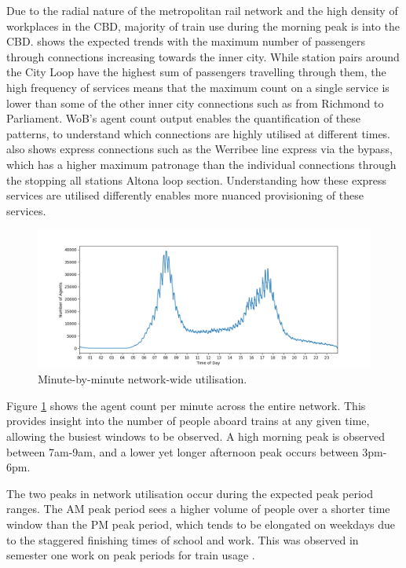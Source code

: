Due to the radial nature of the metropolitan rail network and the high density of workplaces in the CBD, majority of train use during the morning peak is into the CBD.  shows the expected trends with the maximum number of passengers through connections increasing towards the inner city. While station pairs around the City Loop have the highest sum of passengers travelling through them, the high frequency of services means that the maximum count on a single service is lower than some of the other inner city connections such as from Richmond to Parliament. WoB's agent count output enables the quantification of these patterns, to understand which connections are highly utilised at different times.  also shows express connections such as the Werribee line express via the bypass, which has a higher maximum patronage than the individual connections through the stopping all stations Altona loop section. Understanding how these express services are utilised differently enables more nuanced provisioning of these services. 

\begin{figure}[ht]
    \centering
    \includegraphics[width=\linewidth]{images/Case_Study/network_util.png}
    \caption[Network-wide utilisation]{Minute-by-minute network-wide utilisation. }
    \label{fig:network_utilisation}
\end{figure}

Figure \ref{fig:network_utilisation} shows the agent count per minute across the entire network. This provides insight into the number of people aboard trains at any given time, allowing the busiest windows to be observed. A high morning peak is observed between 7am-9am, and a lower yet longer afternoon peak occurs between 3pm-6pm. 

The two peaks in network utilisation occur during the expected peak period ranges. The AM peak period sees a higher volume of people over a shorter time window than the PM peak period, which tends to be elongated on weekdays due to the staggered finishing times of school and work. This was observed in semester one work on peak periods for train usage \cite{tranChangesPeakPeriods2024}.

